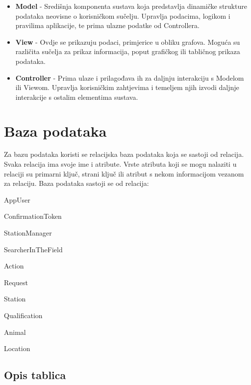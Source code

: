 	\begin{itemize}
		\item \textbf{Model} - Središnja komponenta sustava koja predstavlja dinamičke strukture podataka neovisne o korisničkom sučelju. Upravlja podacima, logikom i pravilima aplikacije, te prima ulazne podatke od Controllera.
		\item \textbf{View} - Ovdje se prikazuju podaci, primjerice u obliku grafova. Moguća su različita sučelja za prikaz informacija, poput grafičkog ili tabličnog prikaza podataka.
		\item \textbf{Controller} - Prima ulaze i prilagođava ih za daljnju interakciju s Modelom ili Viewom. Upravlja korisničkim zahtjevima i temeljem njih izvodi daljnje interakcije s ostalim elementima sustava.
	\end{itemize}
		

		

				
		\section{Baza podataka}
				
				Za bazu podataka koristi se relacijska baza podataka koja se sastoji od relacija. Svaka relacija ima svoje ime i atribute. Vrste atributa koji se mogu nalaziti u relaciji su primarni ključ, strani ključ ili atribut s nekom informacijom vezanom za relaciju. Baza podataka sastoji se od relacija:
		
				\begin{packed_item}
					\item AppUser
					\item ConfirmationToken
					\item StationManager
					\item SearcherInTheField
					\item Action
					\item Request
					\item Station
					\item Qualification
					\item Animal
					\item Location
				\end{packed_item}
		
			\subsection{Opis tablica}
			


